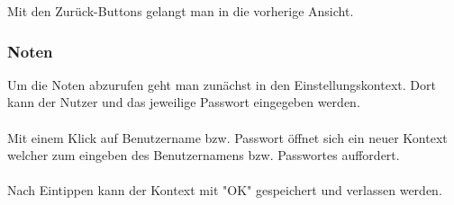 Mit den Zurück-Buttons gelangt man in die vorherige Ansicht.

\newpage
\subsubsection{Noten}

Um die Noten abzurufen geht man zunächst in den Einstellungskontext. Dort kann der Nutzer und das jeweilige Passwort eingegeben werden.
\\
\\
Mit einem Klick auf Benutzername bzw. Passwort öffnet sich ein neuer Kontext welcher zum eingeben des Benutzernamens bzw. Passwortes auffordert.
\\
\\
Nach Eintippen kann der Kontext mit "OK" gespeichert und verlassen werden.

